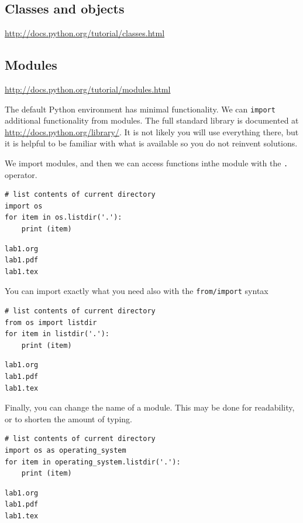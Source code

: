 \documentclass[11pt]{article}
\begin{document}
\subsection{Classes and objects}
\label{sec:org4605665}
\url{http://docs.python.org/tutorial/classes.html}


\subsection{Modules}
\label{sec:org7f9d148}
\url{http://docs.python.org/tutorial/modules.html}

The default Python environment has minimal functionality. We can \texttt{import} additional functionality from modules. The full standard library is documented at \url{http://docs.python.org/library/}. It is not likely you will use everything there, but it is helpful to be familiar with what is available so you do not reinvent solutions.

We import modules, and then we can access functions inthe module with the \texttt{.} operator.

\begin{verbatim}
# list contents of current directory
import os
for item in os.listdir('.'):
    print (item)
\end{verbatim}

\begin{verbatim}
lab1.org
lab1.pdf
lab1.tex
\end{verbatim}

You can import exactly what you need also with the \texttt{from/import} syntax
\begin{verbatim}
# list contents of current directory
from os import listdir
for item in listdir('.'):
    print (item)
\end{verbatim}

\begin{verbatim}
lab1.org
lab1.pdf
lab1.tex
\end{verbatim}

Finally, you can change the name of a module. This may be done for readability, or to shorten the amount of typing.
\begin{verbatim}
# list contents of current directory
import os as operating_system
for item in operating_system.listdir('.'):
    print (item)
\end{verbatim}

\begin{verbatim}
lab1.org
lab1.pdf
lab1.tex
\end{verbatim}
\end{document}
